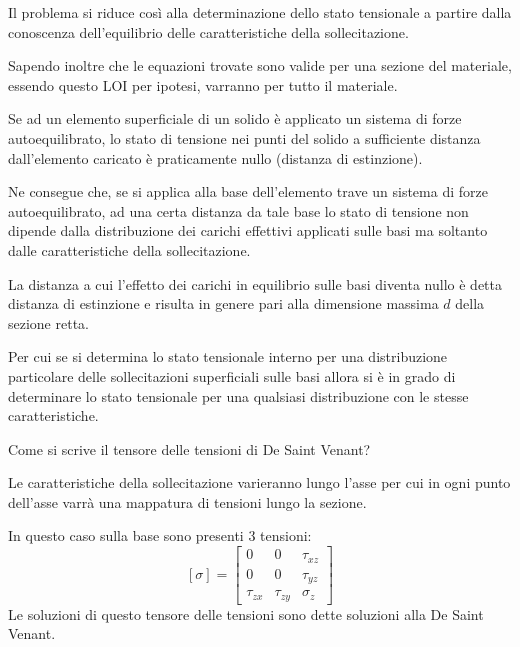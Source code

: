 	Il problema si riduce così alla determinazione dello stato tensionale a partire dalla conoscenza dell'equilibrio delle caratteristiche della sollecitazione. 

	Sapendo inoltre che le equazioni trovate sono valide per una sezione del materiale, essendo questo LOI per ipotesi, varranno per tutto il materiale. \newline

   \begin{en} 
		Se ad un elemento superficiale di un solido è applicato un sistema di forze autoequilibrato, lo stato di tensione nei punti del solido a sufficiente distanza dall’elemento caricato è praticamente nullo (distanza di estinzione).
	\end{en}  
	
	Ne consegue che, se si applica alla base dell'elemento trave un sistema di forze autoequilibrato, ad una certa distanza da tale base lo stato di tensione non dipende dalla
	distribuzione dei carichi effettivi applicati sulle basi ma soltanto dalle caratteristiche della sollecitazione. \newline	
	
	La distanza a cui l’effetto dei carichi in equilibrio sulle basi diventa nullo è detta distanza di estinzione e risulta in genere pari alla dimensione massima $ d $ della sezione retta.\newline 
	
	Per cui se si determina lo stato tensionale interno per una distribuzione particolare delle sollecitazioni superficiali
	sulle basi allora si è in grado di determinare lo stato tensionale per una qualsiasi distribuzione con le
	stesse caratteristiche. \newline 
	
	Come si scrive il tensore delle tensioni di De Saint Venant? 
	
	Le caratteristiche della sollecitazione varieranno lungo l'asse per cui in ogni punto dell'asse varrà una mappatura di tensioni lungo la sezione. \newline	
	 
	In questo caso sulla base sono presenti 3 tensioni: 
	\begin{equation}
	\boxed{[\sigma] = \left[ \begin{array}{ccc}
		0 & 0 & \tau_{xz} \\
		0 & 0 & \tau_{yz} \\
		\tau_{zx} & \tau_{zy} & \sigma_z
	\end{array}\right]}
	\end{equation} 
	Le soluzioni di questo tensore delle tensioni sono dette soluzioni alla De Saint Venant. \newline 

